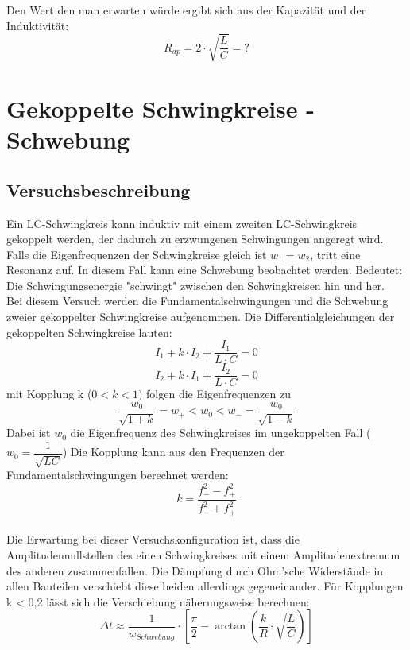 \documentclass[12pt,a4paper]{article}
\begin{document}
Den Wert den man erwarten würde ergibt sich aus der Kapazität und der Induktivität:
\begin{equation}
R_{ap}=2\cdot \sqrt{\frac{L}{C}}=?
\end{equation}


\section{Gekoppelte Schwingkreise - Schwebung}
\subsection{Versuchsbeschreibung}
Ein LC-Schwingkreis kann induktiv mit einem zweiten LC-Schwingkreis gekoppelt werden, der dadurch zu erzwungenen Schwingungen angeregt wird. Falls die Eigenfrequenzen der Schwingkreise gleich ist $w_1 = w_2$, tritt eine Resonanz auf. In diesem Fall kann eine Schwebung beobachtet werden. Bedeutet: Die Schwingungsenergie "schwingt" zwischen den Schwingkreisen hin und her. \\
Bei diesem Versuch werden die Fundamentalschwingungen und die Schwebung zweier gekoppelter Schwingkreise aufgenommen. Die Differentialgleichungen der gekoppelten Schwingkreise lauten:
\begin{equation}
\ddot{I_1} + k \cdot \ddot{I_2} + \dfrac{I_1}{L \cdot C} = 0
\end{equation}
\begin{equation}
\ddot{I_2} + k \cdot \ddot{I_1} + \dfrac{I_2}{L \cdot C} = 0
\end{equation}
mit Kopplung k ($0 < k < 1)$ folgen die Eigenfrequenzen zu
\begin{equation}
\dfrac{w_0}{\sqrt{1+k}} = w_+ < w_0 < w_- = \dfrac{w_0}{\sqrt{1-k}} 
\end{equation}
Dabei ist $w_0$ die Eigenfrequenz des Schwingkreises im ungekoppelten Fall ($w_0 = \dfrac{1}{\sqrt{LC}}$)
Die Kopplung kann aus den Frequenzen der Fundamentalschwingungen berechnet werden:
\begin{equation}
k = \dfrac{f_-^2 - f_+^2}{f_-^2 + f_+^2}
\label{eq:Kopplung}
\end{equation}
\\ Die Erwartung bei dieser Versuchskonfiguration ist, dass die Amplitudennullstellen des einen Schwingkreises mit einem Amplitudenextremum des anderen zusammenfallen. Die Dämpfung durch Ohm'sche Widerstände in allen Bauteilen verschiebt diese beiden allerdings gegeneinander. Für Kopplungen k < 0,2 lässt sich die Verschiebung näherungsweise berechnen:
\begin{equation}
\Delta t \approx \dfrac{1}{w_{Schwebung}} \cdot \left[\dfrac{\pi}{2} - \arctan \left( \dfrac{k}{R} \cdot \sqrt{\dfrac{L}{C}} \right)\right]
\label{eq:delta_t}
\end{equation}
\end{document}
